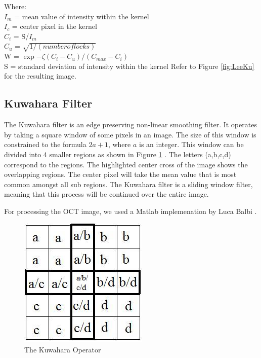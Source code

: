 \documentclass[%
reprint,
showpacs,preprintnumbers,
bibnotes,
amsmath,amssymb,
aps,
pra,
]{revtex4-1}
\begin{document}
Where:
\\
	$I_{m}$ = mean value of intensity within the kernel
	\\
	$I_{c}$ = center pixel in the kernel
	\\
	$C_{i}$ = S/$I_{m}$
	\\
	$C_{u}$ = $\sqrt{1/(number of locks)}$
	\\
	W				= $\exp{-\zeta(C_{i}-C_{u})/(C_{max}-C_{i})}$
	\\
	S       = standard deviation of intensity within the kernel
	\cite{radarlee}
  Refer to Figure \ref{fig:LeeKu} for the resulting image.
\subsection{\label{sec:level2} Kuwahara Filter}

The Kuwahara filter is an edge preserving non-linear smoothing filter. It operates by taking a square window of some pixels in an image. The size of this window is constrained to the formula $2a + 1$, where $a$ is an integer. This window can be divided into 4 smaller regions as shown in Figure \ref{fig:kusquares} \cite{Papari_2007}. The letters (a,b,c,d) correspond to the regions. The highlighted center cross of the image shows the overlapping regions. The center pixel will take the mean value that is most common amongst all sub regions. The Kuwahara filter is a sliding window filter, meaning that this process will be continued over the entire image.

For processing the OCT image, we used a Matlab implemenation by Luca Balbi \cite{balbi_faster}.
\begin{figure}
  \centering
  \includegraphics[width=0.8\linewidth]{Figures/kusquares}
  \caption{The Kuwahara Operator \cite{kuwahara_operator}}
  \label{fig:kusquares}
\end{figure}
\end{document}
